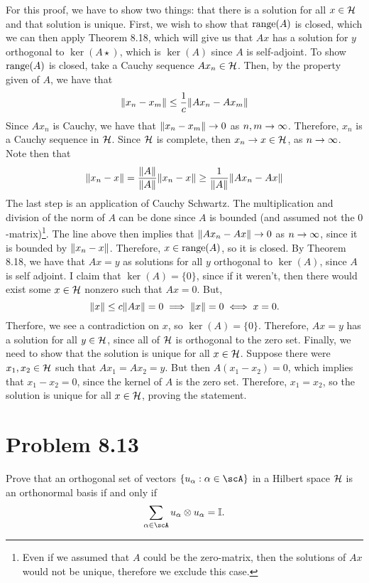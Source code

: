 \begin{solution}

    For this proof, we have to show two things: that there is a solution for all $x \in \mathcal{H}$ and that solution is unique. First, we wish to show that $\text{range} (A)$ is closed, which we can then apply Theorem 8.18, which will give us that $Ax$ has a solution for $y$ orthogonal to $\ker (A\star)$, which is $\ker(A)$ since $A$ is self-adjoint. To show $\text{range} (A)$ is closed, take a Cauchy sequence $Ax_n \in\mathcal{H}$. Then, by the property given of $A$, we have that 
    \[\norm{x_n - x_m} \leq \frac{1}{c}\norm{Ax_n - Ax_m}\]
    Since $Ax_n$ is Cauchy, we have that $\norm{x_n - x_m} \rightarrow 0$ as $n, m \rightarrow \infty$. Therefore, $x_n$ is a Cauchy sequence in $\mathcal{H}$. Since $\mathcal{H}$ is complete, then $x_n \rightarrow x \in \mathcal{H}$, as $n \rightarrow \infty$. Note then that
    \[\norm{x_n - x} = \frac{\norm{A}}{\norm{A}}\norm{x_n - x} \geq \frac{1}{\norm{A}}\norm{Ax_n - Ax}\]
    The last step is an application of Cauchy Schwartz. The multiplication and division of the norm of $A$ can be done since $A$ is bounded (and assumed not the $0$-matrix)\footnote{Even if we assumed that $A$ could be the zero-matrix, then the solutions of $Ax$ would not be unique, therefore we exclude this case.}. The line above then implies that $\norm{Ax_n - Ax} \rightarrow 0$ as $n \rightarrow \infty$, since it is bounded by $\norm{x_n - x}$. Therefore, $x\in \text{range} (A)$, so it is closed. By Theorem 8.18, we have that $Ax = y$ as solutions for all $y$ orthogonal to $\ker (A)$, since $A$ is self adjoint. I claim that $\ker (A) = \{0\}$, since if it weren't, then there would exist some $x \in \mathcal{H}$ nonzero such that $Ax = 0$. But, 
    \[\norm{x} \leq c\norm{Ax} = 0 \implies \norm{x} = 0 \iff x = 0.\]
    Therfore, we see a contradiction on $x$, so $\ker (A) = \{0\}$. Therefore, $Ax = y$ has a solution for all $y \in \mathcal{H}$, since all of $\mathcal{H}$ is orthogonal to the zero set. Finally, we need to show that the solution is unique for all $x \in \mathcal{H}$. Suppose there were $x_1, x_2 \in \mathcal{H}$ such that $Ax_1 = Ax_2 = y$. But then $A(x_1 - x_2) = 0$, which implies that $x_1 - x_2 = 0$, since the kernel of $A$ is the zero set. Therefore, $x_1 = x_2$, so the solution is unique for all $x \in \mathcal{H}$, proving the statement. 
\end{solution}

\newpage
\section{Problem 8.13}
Prove that an orthogonal set of vectors $\{u_\alpha : \alpha \in \scA \}$ in a Hilbert space $\mathcal{H}$ is an orthonormal basis if and only if 
\[\sum_{\alpha \in \scA} u_\alpha \otimes u_\alpha = \id. \]

